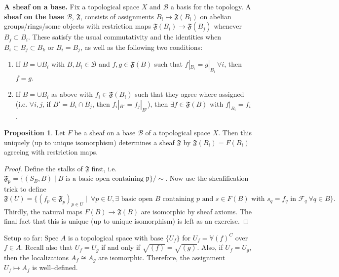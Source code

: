 \documentclass{article}
\theoremstyle{definition}
\newtheorem{prop}[theorem]{Proposition}
\begin{document}
\textbf{A sheaf on a base.} Fix a topological space $X$ and $\mathcal{B}$ a basis for the topology. A \textbf{sheaf on the base $\mathcal{B}$}, $\mathfrak{F}$, consists of assignments $B_i \mapsto \mathfrak{F}(B_i)$ on abelian groups/rings/some objects with restriction maps $\mathfrak{F}(B_i) \to \mathfrak{F}(B_j)$ whenever $B_j \subset B_i$. These satisfy the usual commutativity and the identities when $B_i \subset B_j \subset B_k$ or $B_i = B_j$, as well as the following two conditions:
\begin{enumerate}[(1)]
    \item If $B = \cup B_i$ with $B, B_i \in \mathcal{B}$ and $f, g \in \mathfrak{F}(B)$ such that $f|_{B_i} = g|_{B_i} ~\forall i$, then $f = g$. 
    \item If $B = \cup B_i$ as above with $f_i \in \mathfrak{F}(B_i)$ such that they agree where assigned (i.e. $\forall i,j$, if $B' = B_i \cap B_j$, then $f_i|_{B'} = f_j|_{B'}$), then $\exists f \in \mathfrak{F}(B)$ with $f|_{B_i} = f_i$.
\end{enumerate}
\begin{prop}
    Let $F$ be a sheaf on a base $\mathcal{B}$ of a topological space $X$. Then this uniquely (up to unique isomorphism) determines a sheaf $\mathfrak{F}$ by $\mathfrak{F}(B_i) = F(B_i)$ agreeing with restriction maps.
\end{prop}
\begin{proof}
    Define the stalks of $\mathfrak{F}$ first, i.e. $\mathfrak{F}_\mathfrak{p} = \{(S_B,B) \mid B \text{ is a basic open containing }\mathfrak{p}\}/\sim$. Now use the sheafification trick to define $$\mathfrak{F}(U) = \{(f_p \in \mathfrak{F}_p)_{p \in U} \mid ~\forall p \in U, \exists \text{ basic open }B \text{ containing }p \text{ and } s \in F(B) \text{ with }s_q = f_q \text{ in }\mathcal{F}_q ~\forall q \in B\}.$$
    Thirdly, the natural maps $F(B) \to \mathfrak{F}(B)$ are isomorphic by sheaf axioms. The final fact that this is unique (up to unique isomorphism) is left as an exercise.
\end{proof}


Setup so far: $\text{Spec }A$ is a topological space with base $\{U_f\}$ for $U_f =\mathbb{V}(f)^C$ over $f \in A$. Recall also that $U_f = U_g$ if and only if $\sqrt{(f)} = \sqrt{(g)}$. Also, if $U_f = U_g$, then the localizations $A_f \cong A_g$ are isomorphic. Therefore, the assignment $U_f \mapsto A_f$ is well--defined.
\end{document}
